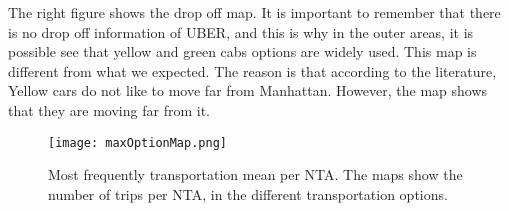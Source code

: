 The right figure shows the drop off map. It is important to remember that there is no drop off information of UBER, and this is why in the outer areas, it is possible see that yellow and green cabs options are widely used. This map is different from what we expected. The reason is that according to the literature, Yellow cars do not like to move far from Manhattan. However, the map shows that they are moving far from it.


\begin{figure}%
\centering
\texttt{[image: maxOptionMap.png]}
\caption{Most frequently transportation mean per NTA. The maps show the number of trips per NTA, in the different transportation options.}
\label{fig:maxMapTotalPickDrop}%
\end{figure}

